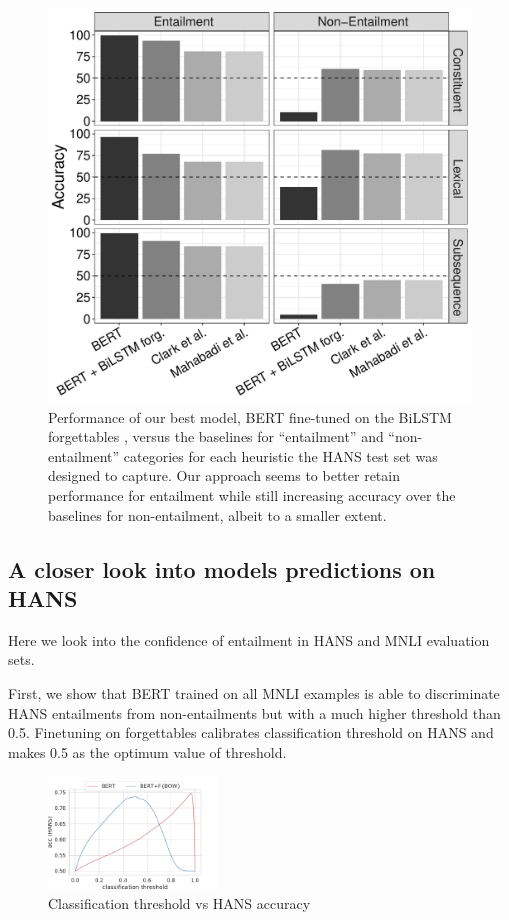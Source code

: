 \begin{figure}[t]
\includegraphics[scale=0.42]{figures/heuristic_plot.pdf}
\caption{Performance of our best model, BERT fine-tuned on the BiLSTM forgettables \flstm, versus the baselines for ``entailment'' and ``non-entailment'' categories for each heuristic the HANS test set was designed to capture. Our approach seems to better retain performance for entailment while still increasing accuracy over the baselines for non-entailment, albeit to a smaller extent.}
\label{fig:fine_eval_baselines}
\end{figure}

\subsection{A closer look into models predictions on HANS}
Here we look into the confidence of entailment in HANS
and MNLI evaluation sets.

First, we show that BERT trained on all MNLI examples is able
to discriminate HANS entailments from non-entailments but with
a much higher threshold than 0.5. 
Finetuning on forgettables calibrates classification
threshold on HANS and makes 0.5 as the optimum value of threshold.

\begin{figure}
    \centering
    \includegraphics[width=0.4\textwidth]{figures/threshold_hans.pdf}
    \caption{Classification threshold vs HANS accuracy}
    \label{fig:threshold_hans}
\end{figure}

